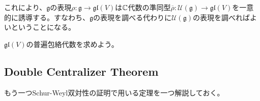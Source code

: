 \documentclass{ltjsreport}
\begin{document}
これにより、$\mathfrak{g}$の表現$\rho:\mathfrak{g}\rightarrow \mathfrak{gl}(V)$は$\mathbb{C}$代数の準同型$\overline{\rho}:\mathcal{U}(\mathfrak{g})\rightarrow \mathfrak{gl}(V)$を一意的に誘導する。すなわち、$\mathfrak{g}$の表現を調べる代わりに$\mathcal{U}(\mathfrak{g})$の表現を調べればよいということになる。


\begin{eg}
  $\mathfrak{gl}(V)$の普遍包絡代数を求めよう。
\end{eg}


\subsection{Double Centralizer Theorem}

もう一つSchur-Weyl双対性の証明で用いる定理を一つ解説しておく。

\begin{theo}
  
\end{theo}
\end{document}
